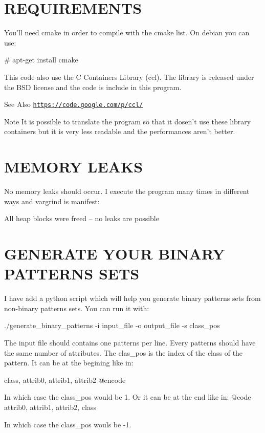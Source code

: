 \section*{R\-E\-Q\-U\-I\-R\-E\-M\-E\-N\-T\-S }

You'll need cmake in order to compile with the cmake list. On debian you can use\-: 
\begin{DoxyCode}
\textcolor{preprocessor}{# apt-get install cmake}
\end{DoxyCode}


This code also use the C Containers Library (ccl). The library is released under the B\-S\-D license and the code is include in this program. \begin{DoxySeeAlso}{See Also}
\href{https://code.google.com/p/ccl/}{\tt https\-://code.\-google.\-com/p/ccl/}
\end{DoxySeeAlso}
\begin{DoxyNote}{Note}
It is possible to translate the program so that it dosen't use these library containers but it is very less readable and the performances aren't better.
\end{DoxyNote}
\section*{M\-E\-M\-O\-R\-Y L\-E\-A\-K\-S }

No memory leaks should occur. I execute the program many times in different ways and vargrind is manifest\-: 
\begin{DoxyCode}
All heap blocks were freed -- no leaks are possible
\end{DoxyCode}


\section*{G\-E\-N\-E\-R\-A\-T\-E Y\-O\-U\-R B\-I\-N\-A\-R\-Y P\-A\-T\-T\-E\-R\-N\-S S\-E\-T\-S }

I have add a python script which will help you generate binary patterns sets from non-\/binary patterns sets. You can run it with\-: 
\begin{DoxyCode}
./generate\_binary\_patterns -i input\_file -o output\_file -s class\_pos
\end{DoxyCode}


The input file should contains one patterns per line. Every patterns should have the same number of attributes. The clas\-\_\-pos is the index of the class of the pattern. It can be at the begining like in\-: 
\begin{DoxyCode}
\textcolor{keyword}{class}, attrib0, attrib1, attrib2
@encode

In which \textcolor{keywordflow}{case} the class\_pos would be 1. Or it can be at the end like in:
@code
attrib0, attrib1, attrib2, \textcolor{keyword}{class}
\end{DoxyCode}
 In which case the class\-\_\-pos wouls be -\/1.

